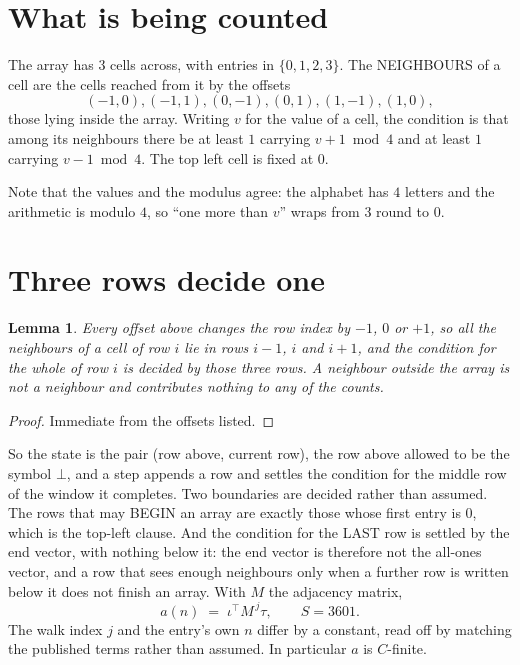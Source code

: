 \documentclass[11pt,a4paper]{article}
\theoremstyle{plain}
\newtheorem{lemma}[theorem]{Lemma}
\theoremstyle{definition}
\begin{document}
\section{What is being counted}

The array has $3$ cells across, with entries in $\{0,1,2,3\}$. The NEIGHBOURS of a cell are the
cells reached from it by the offsets
\[
(-1,0), (-1,1), (0,-1), (0,1), (1,-1), (1,0),
\]
those lying inside the array. Writing $v$ for the value of a cell, the condition is that among
its neighbours there be at least $1$ carrying $v+1 \bmod 4$ and at least $1$ carrying $v-1 \bmod 4$. The top left
cell is fixed at $0$.

Note that the values and the modulus agree: the alphabet has $4$ letters and the arithmetic
is modulo $4$, so ``one more than $v$'' wraps from $3$ round to $0$.

\section{Three rows decide one}

\begin{lemma}\label{lem:win}
Every offset above changes the row index by $-1$, $0$ or $+1$, so all the neighbours of a cell
of row $i$ lie in rows $i-1$, $i$ and $i+1$, and the condition for the whole of row $i$ is
decided by those three rows. A neighbour outside the array is not a neighbour and contributes
nothing to any of the counts.
\end{lemma}

\begin{proof}
Immediate from the offsets listed.
\end{proof}

So the state is the pair (row above, current row), the row above allowed to be the symbol
$\bot$, and a step appends a row and settles the condition for the middle row of the window it
completes. Two boundaries are decided rather than assumed. The rows that may BEGIN an array are
exactly those whose first entry is $0$, which is the top-left clause. And the condition for the
LAST row is settled by the end vector, with nothing below it: the end vector is therefore not
the all-ones vector, and a row that sees enough neighbours only when a further row is written
below it does not finish an array. With $M$ the adjacency matrix,
\[
a(n)\;=\;\iota^{\!\top}M^{\,j}\tau ,\qquad S=3601.
\]
The walk index $j$ and the entry's own $n$ differ by a constant, read off by matching the
published terms rather than assumed. In particular $a$ is $C$-finite.
\end{document}

